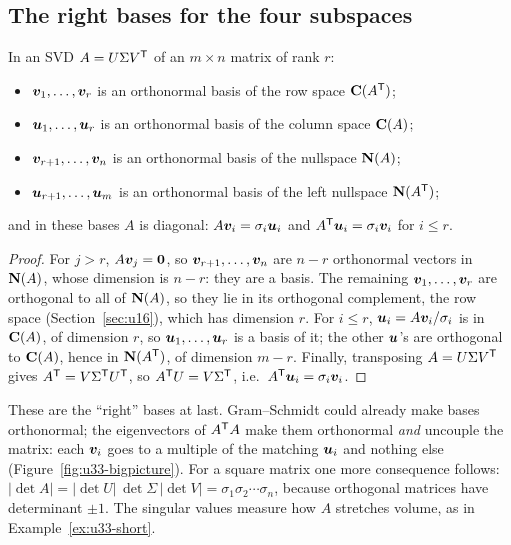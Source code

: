 \subsection{The right bases for the four subspaces}

\begin{theorem}\label{thm:u33-bases}
In an SVD $A=U\Sigma V^{\mathsf{T}}$ of an $m\times n$ matrix of rank $r$:
\begin{itemize}
  \item $\boldsymbol{v}_1,\dots,\boldsymbol{v}_r$ is an orthonormal basis of the row space $\mathbf{C}(A^{\mathsf{T}})$;
  \item $\boldsymbol{u}_1,\dots,\boldsymbol{u}_r$ is an orthonormal basis of the column space $\mathbf{C}(A)$;
  \item $\boldsymbol{v}_{r+1},\dots,\boldsymbol{v}_n$ is an orthonormal basis of the nullspace $\mathbf{N}(A)$;
  \item $\boldsymbol{u}_{r+1},\dots,\boldsymbol{u}_m$ is an orthonormal basis of the left nullspace $\mathbf{N}(A^{\mathsf{T}})$;
\end{itemize}
and in these bases $A$ is diagonal: $A\boldsymbol{v}_i=\sigma_i\boldsymbol{u}_i$ and $A^{\mathsf{T}}\boldsymbol{u}_i=\sigma_i\boldsymbol{v}_i$ for $i\le r$.
\end{theorem}
\begin{proof}
For $j>r$, $A\boldsymbol{v}_j=\boldsymbol{0}$, so $\boldsymbol{v}_{r+1},\dots,\boldsymbol{v}_n$ are $n-r$ orthonormal vectors in $\mathbf{N}(A)$, whose
dimension is $n-r$: they are a basis. The remaining $\boldsymbol{v}_1,\dots,\boldsymbol{v}_r$ are orthogonal to all of
$\mathbf{N}(A)$, so they lie in its orthogonal complement, the row space (Section~\ref{sec:u16}), which has
dimension $r$. For $i\le r$, $\boldsymbol{u}_i=A\boldsymbol{v}_i/\sigma_i$ is in $\mathbf{C}(A)$, of dimension $r$, so
$\boldsymbol{u}_1,\dots,\boldsymbol{u}_r$ is a basis of it; the other $\boldsymbol{u}$'s are orthogonal to $\mathbf{C}(A)$, hence in
$\mathbf{N}(A^{\mathsf{T}})$, of dimension $m-r$. Finally, transposing $A=U\Sigma V^{\mathsf{T}}$ gives $A^{\mathsf{T}}=V\Sigma^{\mathsf{T}} U^{\mathsf{T}}$, so
$A^{\mathsf{T}} U=V\Sigma^{\mathsf{T}}$, i.e.\ $A^{\mathsf{T}}\boldsymbol{u}_i=\sigma_i\boldsymbol{v}_i$.
\end{proof}

These are the ``right'' bases at last. Gram--Schmidt could already make bases orthonormal; the
eigenvectors of $A^{\mathsf{T}} A$ make them orthonormal \emph{and} uncouple the matrix: each $\boldsymbol{v}_i$ goes to
a multiple of the matching $\boldsymbol{u}_i$ and nothing else (Figure~\ref{fig:u33-bigpicture}). For a square
matrix one more consequence follows: $|\det A|=|\det U|\,\det\Sigma\,|\det V|=\sigma_1\sigma_2\cdots\sigma_n$,
because orthogonal matrices have determinant $\pm1$. The singular values measure how $A$ stretches
volume, as in Example~\ref{ex:u33-short}.

